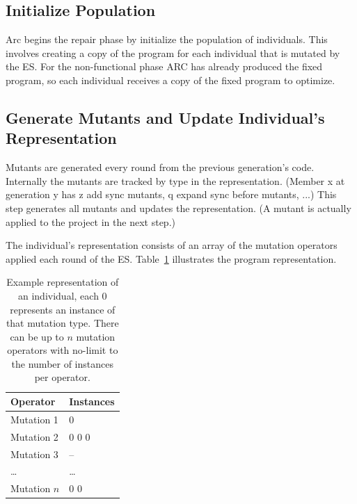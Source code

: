 \documentclass[10pt, conference, compsocconf]{IEEEtran}
\begin{document}
\subsection{Initialize Population}
\label{sec:initialize_population}

Arc begins the repair phase by initialize the population of individuals. 
This involves creating a copy of the program for each individual that is
mutated by the ES. For the non-functional phase ARC has already produced
the fixed program, so each individual receives a copy of the fixed 
program to optimize.

\subsection{Generate Mutants and Update Individual's Representation}
\label{sec:update_individual_representation}

Mutants are generated every round from the previous generation's code.
Internally the mutants are tracked by type in the representation.  (Member
x at generation y has z add sync mutants, q expand sync before mutants, ...)
This step generates all mutants and updates the representation. (A mutant is
actually applied to the project in the next step.)

The individual's representation consists of an array of the mutation 
operators applied each round of the ES. Table~\ref{tbl:individual_representation} 
illustrates the program representation.

\begin{table}[!h]
\begin{center}
\begin{tabular}{|l|l|}
\hline
\textbf{Operator} &
\textbf{Instances}
\\\hline
Mutation 1 & 0
\\\hline
Mutation 2 & 0 0 0
\\\hline
Mutation 3 & --
\\\hline
\ldots & \ldots
\\\hline
Mutation $n$ & 0 0
\\\hline
\end{tabular}
\caption{Example representation of an individual, each 0 represents
an instance of that mutation type. There can be up to $n$ mutation 
operators with no-limit to the number of instances per operator.}
\label{tbl:individual_representation}
\end{center}
\end{table}
\end{document}
